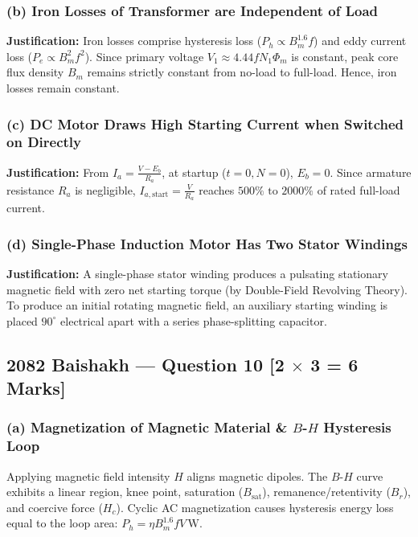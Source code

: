\documentclass[11pt,a4paper,oneside]{article}
\begin{document}
\subsubsection*{(b) Iron Losses of Transformer are Independent of Load}
\textbf{Justification:} Iron losses comprise hysteresis loss ($P_h \propto B_m^{1.6} f$) and eddy current loss ($P_e \propto B_m^2 f^2$). Since primary voltage $V_1 \approx 4.44 f N_1 \Phi_m$ is constant, peak core flux density $B_m$ remains strictly constant from no-load to full-load. Hence, iron losses remain constant.

\subsubsection*{(c) DC Motor Draws High Starting Current when Switched on Directly}
\textbf{Justification:} From $I_a = \frac{V - E_b}{R_a}$, at startup ($t=0, N=0$), $E_b = 0$. Since armature resistance $R_a$ is negligible, $I_{a,\text{start}} = \frac{V}{R_a}$ reaches $500\%\text{ to }2000\%$ of rated full-load current.

\subsubsection*{(d) Single-Phase Induction Motor Has Two Stator Windings}
\textbf{Justification:} A single-phase stator winding produces a pulsating stationary magnetic field with zero net starting torque (by Double-Field Revolving Theory). To produce an initial rotating magnetic field, an auxiliary starting winding is placed $90^\circ$ electrical apart with a series phase-splitting capacitor.

\vspace{0.8cm}
\subsection{2082 Baishakh --- Question 10 [2 $\times$ 3 = 6 Marks]}

\subsubsection*{(a) Magnetization of Magnetic Material \& $B$-$H$ Hysteresis Loop}
Applying magnetic field intensity $H$ aligns magnetic dipoles. The $B$-$H$ curve exhibits a linear region, knee point, saturation ($B_{\text{sat}}$), remanence/retentivity ($B_r$), and coercive force ($H_c$). Cyclic AC magnetization causes hysteresis energy loss equal to the loop area: $P_h = \eta B_m^{1.6} f V\,\mathrm{W}$.
\end{document}
